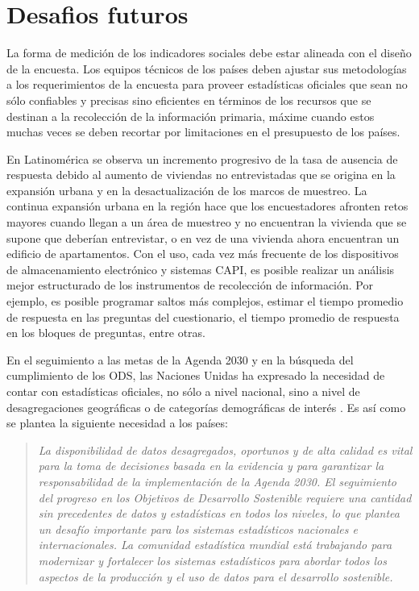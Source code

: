 \documentclass[12pt,spanish,]{book}
\begin{document}
\hypertarget{desafios-futuros}{%
\chapter{Desafios futuros}\label{desafios-futuros}}

La forma de medición de los indicadores sociales debe estar alineada con el diseño de la encuesta. Los equipos técnicos de los países deben ajustar sus metodologías a los requerimientos de la encuesta para proveer estadísticas oficiales que sean no sólo confiables y precisas sino eficientes en términos de los recursos que se destinan a la recolección de la información primaria, máxime cuando estos muchas veces se deben recortar por limitaciones en el presupuesto de los países.

En Latinomérica se observa un incremento progresivo de la tasa de ausencia de respuesta debido al aumento de viviendas no entrevistadas que se origina en la expansión urbana y en la desactualización de los marcos de muestreo. La continua expansión urbana en la región hace que los encuestadores afronten retos mayores cuando llegan a un área de muestreo y no encuentran la vivienda que se supone que deberían entrevistar, o en vez de una vivienda ahora encuentran un edificio de apartamentos. Con el uso, cada vez más frecuente de los dispositivos de almacenamiento electrónico y sistemas CAPI, es posible realizar un análisis mejor estructurado de los instrumentos de recolección de información. Por ejemplo, es posible programar saltos más complejos, estimar el tiempo promedio de respuesta en las preguntas del cuestionario, el tiempo promedio de respuesta en los bloques de preguntas, entre otras.

En el seguimiento a las metas de la Agenda 2030 y en la búsqueda del cumplimiento de los ODS, las Naciones Unidas ha expresado la necesidad de contar con estadísticas oficiales, no sólo a nivel nacional, sino a nivel de desagregaciones geográficas o de categorías demográficas de interés \autocite{United_Nations_2017}. Es así como se plantea la siguiente necesidad a los países:

\begin{quote}
\emph{La disponibilidad de datos desagregados, oportunos y de alta calidad es vital para la toma de decisiones basada en la evidencia y para garantizar la responsabilidad de la implementación de la Agenda 2030. El seguimiento del progreso en los Objetivos de Desarrollo Sostenible requiere una cantidad sin precedentes de datos y estadísticas en todos los niveles, lo que plantea un desafío importante para los sistemas estadísticos nacionales e internacionales. La comunidad estadística mundial está trabajando para modernizar y fortalecer los sistemas estadísticos para abordar todos los aspectos de la producción y el uso de datos para el desarrollo sostenible.}
\end{quote}
\end{document}
